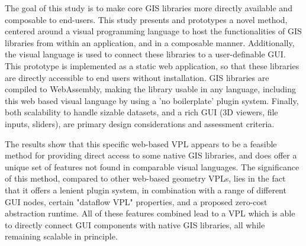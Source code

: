 The goal of this study is to make core \ac{GIS} libraries more directly available and composable to end-users.
This study presents and prototypes a novel method, centered around a visual programming language to host the functionalities of \ac{GIS} libraries from within an application, and in a composable manner. 
Additionally, the visual language is used to connect these libraries to a user-definable \ac{GUI}. 
This prototype is implemented as a static web application, so that these libraries are directly accessible to end users without installation.
\ac{GIS} libraries are compiled to WebAssembly, making the library usable in any language, including this web based visual language by using a 'no boilerplate' plugin system. 
Finally, both scalability to handle sizable datasets, and a rich \ac{GUI} (3D viewers, file inputs, sliders), are primary design considerations and assessment criteria.
 
The results show that this specific web-based VPL appears to be a feasible method for providing direct access to some native \ac{GIS} libraries, and does offer a unique set of features not found in comparable visual languages. 
The significance of this method, compared to other web-based geometry VPLs, lies in the fact that it offers a lenient plugin system, in combination with a range of different \ac{GUI} nodes, certain "dataflow VPL" properties, and a proposed zero-cost abstraction runtime. 
All of these features combined lead to a VPL which is able to directly connect \ac{GUI} components with native \ac{GIS} libraries, all while remaining scalable in principle.

